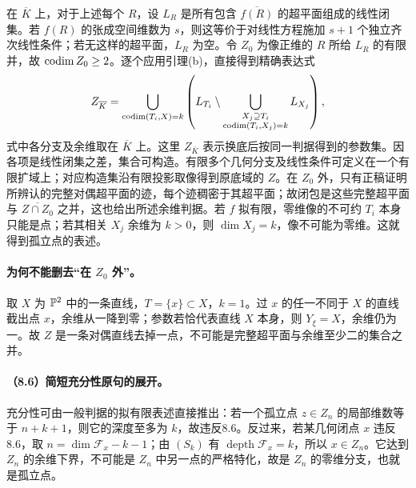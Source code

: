 在 $\overline K$ 上，对于上述每个 $R$，设 $L_R$ 是所有包含 $\overline{f(R)}$ 的超平面组成的线性闭集。若 $f(R)$ 的张成空间维数为 $s$，则这等价于对线性方程施加 $s+1$ 个独立齐次线性条件；若无这样的超平面，$L_R$ 为空。令 $Z_0$ 为像正维的 $R$ 所给 $L_R$ 的有限并，故 $\operatorname{codim} Z_0\ge2$。逐个应用引理(b)，直接得到精确表达式
\[
 Z_{\overline K}=
 \bigcup_{\operatorname{codim}(T_i,X)=k}
 \left(L_{T_i}\setminus
 \bigcup_{\substack{X_j\supseteq T_i\\\operatorname{codim}(T_i,X_j)=k}} L_{X_j}\right),
\]
式中各分支及余维取在 $\overline K$ 上。这里 $Z_{\overline K}$ 表示换底后按同一判据得到的参数集。因各项是线性闭集之差，集合可构造。有限多个几何分支及线性条件可定义在一个有限扩域上；对应构造集沿有限投影取像得到原底域的 $Z$。在 $Z_0$ 外，只有正稿证明所辨认的完整对偶超平面的迹，每个迹稠密于其超平面；故闭包是这些完整超平面与 $\overline{Z\cap Z_0}$ 之并，这也给出所述余维判据。若 $f$ 拟有限，零维像的不可约 $T_i$ 本身只能是点；若其相关 $X_j$ 余维为 $k>0$，则 $\dim X_j=k$，像不可能为零维。这就得到孤立点的表述。

\paragraph{为何不能删去“在 $Z_0$ 外”。}
取 $X$ 为 $\PP^2$ 中的一条直线，$T=\{x\}\subset X$，$k=1$。过 $x$ 的任一不同于 $X$ 的直线截出点 $x$，余维从一降到零；参数若恰代表直线 $X$ 本身，则 $Y_\xi=X$，余维仍为一。故 $Z$ 是一条对偶直线去掉一点，不可能是完整超平面与余维至少二的集合之并。

\endgroup


\hypertarget{D18-103-notes}{}

\begingroup
\def\PP{\mathbb P}\def\OO{\mathcal O}\def\Ocal{\mathcal O}
\def\F{\mathcal F}\def\G{\mathcal G}\def\N{\mathcal N}
\def\PD{\check P}\def\Pdual{\check P}
\def\Ys{Y^{\mathrm{sing}}}\def\Ysing{Y^{\mathrm{sing}}}
\def\Ds{Y^{\mathrm{sup\,sing}}}\def\Ysup{Y^{\mathrm{sup\,sing}}}
\def\cod{\operatorname{codim}}\def\Sing{\operatorname{Sing}}
\def\depth{\operatorname{depth}}\def\coprof{\operatorname{coprof}}
\def\Ass{\operatorname{Ass}}\def\Supp{\operatorname{Supp}}
\def\Gr{\operatorname{Gr}}\def\Spec{\operatorname{Spec}}\def\Proj{\operatorname{Proj}}


\paragraph{（8.6）简短充分性原句的展开。}
充分性可由一般判据的拟有限表述直接推出：若一个孤立点 $z\in Z_n$ 的局部维数等于 $n+k+1$，则它的深度至多为 $k$，故违反8.6。反过来，若某几何闭点 $x$ 违反8.6，取 $n=\dim\F_x-k-1$；由 $(S_k)$ 有 $\depth\F_x=k$，所以 $x\in Z_n$。它达到 $Z_n$ 的余维下界，不可能是 $Z_n$ 中另一点的严格特化，故是 $Z_n$ 的零维分支，也就是孤立点。

